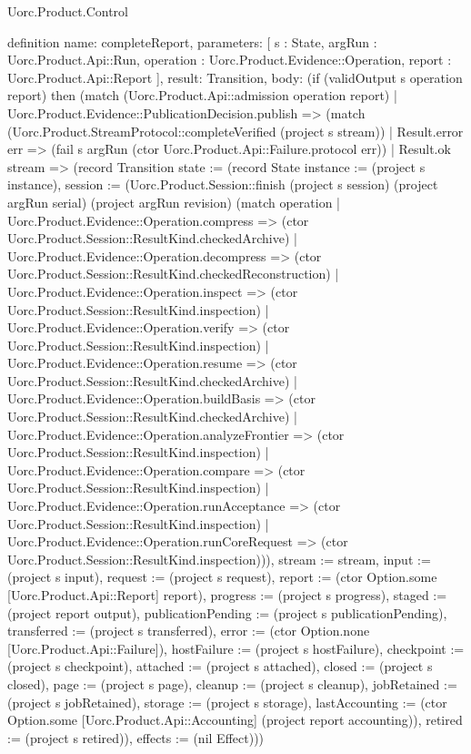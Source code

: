 \begin{lexlean}{Uorc.Product.Control}
\begin{semanticmodule}
definition{
  name: completeReport,
  parameters: [
    s : State,
    argRun : Uorc.Product.Api::Run,
    operation : Uorc.Product.Evidence::Operation,
    report : Uorc.Product.Api::Report
  ],
  result: Transition,
  body: (if (validOutput s operation report) then (match (Uorc.Product.Api::admission operation report)
    | Uorc.Product.Evidence::PublicationDecision.publish => (match (Uorc.Product.StreamProtocol::completeVerified (project s stream))
      | Result.error err => (fail s argRun (ctor Uorc.Product.Api::Failure.protocol err))
      | Result.ok stream => (record Transition {state := (record State {instance := (project s instance), session := (Uorc.Product.Session::finish (project s session) (project argRun serial) (project argRun revision) (match operation
        | Uorc.Product.Evidence::Operation.compress => (ctor Uorc.Product.Session::ResultKind.checkedArchive)
        | Uorc.Product.Evidence::Operation.decompress => (ctor Uorc.Product.Session::ResultKind.checkedReconstruction)
        | Uorc.Product.Evidence::Operation.inspect => (ctor Uorc.Product.Session::ResultKind.inspection)
        | Uorc.Product.Evidence::Operation.verify => (ctor Uorc.Product.Session::ResultKind.inspection)
        | Uorc.Product.Evidence::Operation.resume => (ctor Uorc.Product.Session::ResultKind.checkedArchive)
        | Uorc.Product.Evidence::Operation.buildBasis => (ctor Uorc.Product.Session::ResultKind.checkedArchive)
        | Uorc.Product.Evidence::Operation.analyzeFrontier => (ctor Uorc.Product.Session::ResultKind.inspection)
        | Uorc.Product.Evidence::Operation.compare => (ctor Uorc.Product.Session::ResultKind.inspection)
        | Uorc.Product.Evidence::Operation.runAcceptance => (ctor Uorc.Product.Session::ResultKind.inspection)
        | Uorc.Product.Evidence::Operation.runCoreRequest => (ctor Uorc.Product.Session::ResultKind.inspection))), stream := stream, input := (project s input), request := (project s request), report := (ctor Option.some [Uorc.Product.Api::Report] report), progress := (project s progress), staged := (project report output), publicationPending := (project s publicationPending), transferred := (project s transferred), error := (ctor Option.none [Uorc.Product.Api::Failure]), hostFailure := (project s hostFailure), checkpoint := (project s checkpoint), attached := (project s attached), closed := (project s closed), page := (project s page), cleanup := (project s cleanup), jobRetained := (project s jobRetained), storage := (project s storage), lastAccounting := (ctor Option.some [Uorc.Product.Api::Accounting] (project report accounting)), retired := (project s retired)}), effects := (nil Effect)}))
}
\end{semanticmodule}
\end{lexlean}
